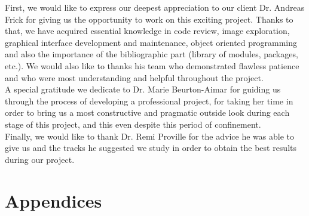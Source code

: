\documentclass[a4paper,12pt]{report}
\begin{document}
First, we would like to express our deepest appreciation to our client Dr. Andreas Frick for giving us the opportunity to work on this exciting project. Thanks to that, we have acquired essential
knowledge in code review, image exploration, graphical interface development and maintenance, object oriented programming and also the importance of the bibliographic part (library of modules, packages, etc.). We would also like to thanks his team who demonstrated flawless patience and who were most understanding and helpful throughout the project. \\

A special gratitude we dedicate to Dr. Marie Beurton-Aimar for guiding us through the process
of developing a professional project, for taking her time in order to bring us a most constructive and pragmatic outside look during each stage of this project, and this even despite this period of confinement. \\

Finally, we would like to thank Dr. Remi Proville for the advice he was able to give us and the tracks he suggested we study in order to obtain the best results during our project. \\




\printbibliography


\chapter*{Appendices}
\end{document}
